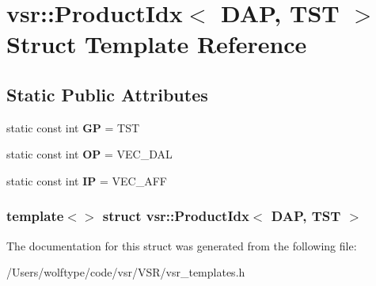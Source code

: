 \hypertarget{structvsr_1_1_product_idx_3_01_d_a_p_00_01_t_s_t_01_4}{\section{vsr\-:\-:Product\-Idx$<$ D\-A\-P, T\-S\-T $>$ Struct Template Reference}
\label{structvsr_1_1_product_idx_3_01_d_a_p_00_01_t_s_t_01_4}
}
\subsection*{Static Public Attributes}
\begin{DoxyCompactItemize}
\item 
\hypertarget{structvsr_1_1_product_idx_3_01_d_a_p_00_01_t_s_t_01_4_a6cf82e622ad47a9a8ffa261534445486}{static const int {\bfseries G\-P} = T\-S\-T}\label{structvsr_1_1_product_idx_3_01_d_a_p_00_01_t_s_t_01_4_a6cf82e622ad47a9a8ffa261534445486}

\item 
\hypertarget{structvsr_1_1_product_idx_3_01_d_a_p_00_01_t_s_t_01_4_aea7ab225240081f330d80370a272e57d}{static const int {\bfseries O\-P} = V\-E\-C\-\_\-\-D\-A\-L}\label{structvsr_1_1_product_idx_3_01_d_a_p_00_01_t_s_t_01_4_aea7ab225240081f330d80370a272e57d}

\item 
\hypertarget{structvsr_1_1_product_idx_3_01_d_a_p_00_01_t_s_t_01_4_afa22999b0104a4c659e494a6e3ad9dca}{static const int {\bfseries I\-P} = V\-E\-C\-\_\-\-A\-F\-F}\label{structvsr_1_1_product_idx_3_01_d_a_p_00_01_t_s_t_01_4_afa22999b0104a4c659e494a6e3ad9dca}

\end{DoxyCompactItemize}
\subsubsection*{template$<$$>$ struct vsr\-::\-Product\-Idx$<$ D\-A\-P, T\-S\-T $>$}



The documentation for this struct was generated from the following file\-:\begin{DoxyCompactItemize}
\item 
/\-Users/wolftype/code/vsr/\-V\-S\-R/vsr\-\_\-templates.\-h\end{DoxyCompactItemize}
